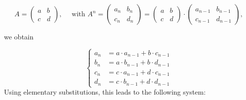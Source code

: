\documentclass[oneside,10pt]{book}
\renewcommand{\arraystretch}{1.4} %
\begin{document}
\renewcommand{\arraystretch}{1.0} %

\begin{equation*}
A = 
\begin{pmatrix}
a & b \\
c & d 
\end{pmatrix},
\quad 
\text{ with }
A^n = 
\begin{pmatrix}
a_n & b_n \\
c _n & d_n 
\end{pmatrix}
=
\begin{pmatrix}
a & b \\
c & d 
\end{pmatrix}
\cdot
\begin{pmatrix}
a_{n-1} & b_{n-1} \\
c_{n-1} & d_{n-1} 
\end{pmatrix},
\end{equation*}

\noindent we obtain

\begin{equation*}
  \left\{
    \begin{aligned}
      a_n & =a\cdot a_{n-1}+b\cdot c_{n-1}\\
      b_n & =a\cdot b_{n-1}+b\cdot d_{n-1}\\
      c_n & =c\cdot a_{n-1}+d\cdot c_{n-1}\\
      d_n & =c\cdot b_{n-1}+d\cdot d_{n-1}
    \end{aligned}
  \right.
\end{equation*}
Using elementary substitutions, this leads to the following system:
\end{document}
